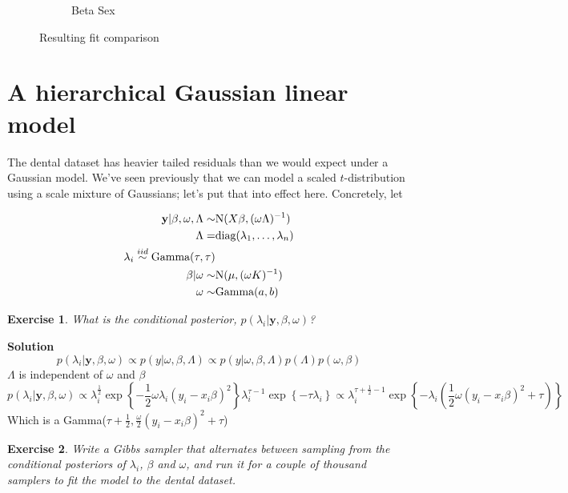 \documentclass[twoside]{article}
\newcounter{lecnum}
\newtheorem{exercise}{Exercise}[lecnum]
\begin{document}
\begin{figure}[H]
\begin{center}
\begin{subfigure}[h]{0.45\linewidth}
			\caption{Beta Sex}
		\end{subfigure}
		\caption{Resulting fit comparison}
		\label{fig:Fig2}
	\end{center}
\end{figure}

\color{black}

\section{A hierarchical Gaussian linear model}
The dental dataset has heavier tailed residuals than we would expect under a Gaussian model. We've seen previously that we can model a scaled $t$-distribution using a scale mixture of Gaussians; let's put that into effect here. Concretely, let

$$\begin{aligned}
  \mathbf{y}|\beta,\omega,\Lambda \sim& \mbox{N}(X\beta, (\omega \Lambda)^{-1})\\
  \Lambda =& \mbox{diag}(\lambda_1,\dots, \lambda_n)\\
  \lambda_i \stackrel{\small{iid}}{\sim} \mbox{Gamma}(\tau,\tau)\\
  \beta|\omega \sim& \mbox{N}(\mu, (\omega K)^{-1})\\
  \omega \sim& \mbox{Gamma}(a,b)
\end{aligned}$$

\begin{exercise}
  What is the conditional posterior, $p(\lambda_i|\mathbf{y},\beta, \omega)$?
\end{exercise}

\color{blue}
\textbf{Solution}
$$
p(\lambda_i|\mathbf{y},\beta, \omega) \propto p(y|\omega, \beta, \Lambda)
\propto p(y|\omega, \beta, \Lambda) p(\Lambda) p(\omega, \beta) $$
$ \Lambda $ is independent of $\omega$ and $\beta$
$$
p(\lambda_i|\mathbf{y},\beta, \omega) \propto 
\lambda_i^{\frac{1}{2}} \exp \left\{ - \frac{1}{2} \omega \lambda_i (y_i - x_i \beta)^2 \right\}
\lambda_i^{\tau-1} \exp \left\{-\tau \lambda_i \right\} 
\propto
\lambda_i^{\tau + \frac{1}{2} - 1} \exp \left\{ - \lambda_i \left( \frac{1}{2} \omega  (y_i - x_i \beta)^2 + \tau\right)  \right\}
$$
Which is a Gamma($\tau+\frac{1}{2}, \frac{\omega}{2}  (y_i - x_i \beta)^2 + \tau $)
\color{black}

\begin{exercise}
  Write a Gibbs sampler that alternates between sampling from the conditional posteriors of $\lambda_i$, $\beta$ and $\omega$, and run it for a couple of thousand samplers to fit the model to the dental dataset. 
\end{exercise}
\end{document}
